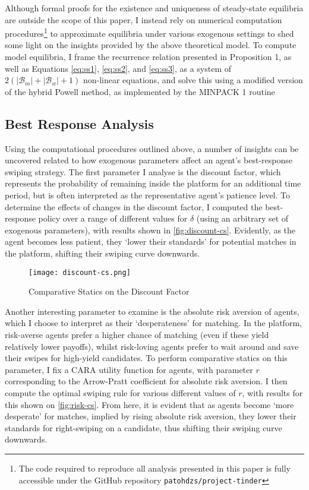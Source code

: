 Although formal proofs for the existence and uniqueness of steady-state equilibria are outside the scope of this paper, I instead rely on numerical computation procedures\footnote{The code required to reproduce all analysis presented in this paper is fully accessible under the GitHub repository \texttt{patohdzs/project-tinder}} to approximate equilibria under various exogenous settings to shed some light on the insights provided by the above theoretical model. To compute model equilibria, I frame the recurrence relation presented in Proposition 1, as well as Equations \ref{eq:ss1}, \ref{eq:ss2}, and \ref{eq:ss3}, as a system of $2(|\mathcal{B}_m|+|\mathcal{B}_w|+1)$ non-linear equations, and solve this using a modified version of the hybrid Powell method, as implemented by the MINPACK 1 routine \citep{more1980user}  

\subsection{Best Response Analysis}\label{sec:section3.2} 
Using the computational procedures outlined above, a number of insights can be uncovered related to how exogenous parameters affect an agent's best-response swiping strategy. The first parameter I analyse is the discount factor, which represents the probability of remaining inside the platform for an additional time period, but is often interpreted as the representative agent's patience level. To determine the effects of changes in the discount factor, I computed the best-response policy over a range of different values for $\delta$ (using an arbitrary set of exogenous parameters), with results shown in \autoref{fig:discount-cs}. Evidently, as the agent becomes less patient, they `lower their standards' for potential matches in the platform, shifting their swiping curve downwards. 

\begin{figure}[ht] 
    \centering
    \caption{Comparative Statics on the Discount Factor}
    \texttt{[image: discount-cs.png]}
    \label{fig:discount-cs}
\end{figure} 

Another interesting parameter to examine is the absolute risk aversion of agents, which I choose to interpret as their `desperateness' for matching. In the platform, risk-averse agents prefer a higher chance of matching (even if these yield relatively lower payoffs), whilst risk-loving agents prefer to wait around and save their swipes for high-yield candidates. To perform comparative statics on this parameter, I fix a CARA utility function for agents, with parameter $r$ corresponding to the Arrow-Pratt coefficient for absolute risk aversion. I then compute the optimal swiping rule for various different values of $r$, with results for this shown on \autoref{fig:risk-cs}. From here, it is evident that as agents become `more desperate' for matches, implied by rising absolute risk aversion, they lower their standards for right-swiping on a candidate, thus shifting their swiping curve downwards.

